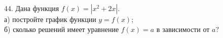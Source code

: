 44. Дана функция $f(x)=|x^2+2x|.$\\
а) постройте график функции $y=f(x);$\\
б) сколько решений имеет уравнение $f(x)=a$ в зависимости от $a?$\\
